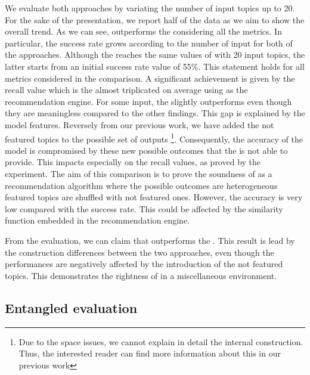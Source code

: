 We evaluate both approaches by variating the number of input topics up to 20. For the sake of the presentation, we report half of the data as we aim to show the overall trend.
As we can see, \CT outperforms the \MNB considering all the metrics. In particular, the success rate grows according to the number of input for both of the approaches. Although the \MNB reaches the same values of \CT with 20 input topics, the latter starts from an initial success rate value of 55\%. This statement holds for all metrics considered in the comparison. A significant achievement is given by the recall value which is the almost triplicated on average using \CT as the recommendation engine. For some input, the \MNB slightly outperforms \CT even though they are meaningless compared to the other findings. 
This gap is explained by the \MNB model features. Reversely from our previous work, we have added the not featured topics to the possible set of outputs \footnote{Due to the space issues, we cannot explain in detail the \MNB internal construction. Thus, the interested reader can find more information about this in our previous work}. Consequently, the accuracy of the model is compromised by these new possible outcomes that the \MNB is not able to provide. This impacts especially on the recall values, as proved by the experiment. The aim of this comparison is to prove the soundness of \CT as a recommendation algorithm where the possible outcomes are heterogeneous \ie featured topics are shuffled with not featured ones. However, the accuracy is very low compared with the success rate. This could be affected by the similarity function embedded in the recommendation engine. 


\begin{tcolorbox}[boxrule=0.86pt,left=0.3em, right=0.3em,top=0.1em, bottom=0.05em]
From the evaluation, we can claim that \CT outperforms the \MNB. This result is lead by the construction differences between the two approaches, even though the \MNB performances are negatively affected by the introduction of the not featured topics. This demonstrates the rightness of \CT in a miscellaneous environment. 
\end{tcolorbox}

\subsection{Entangled evaluation} \label{sec:EXP3}
\rqthird

